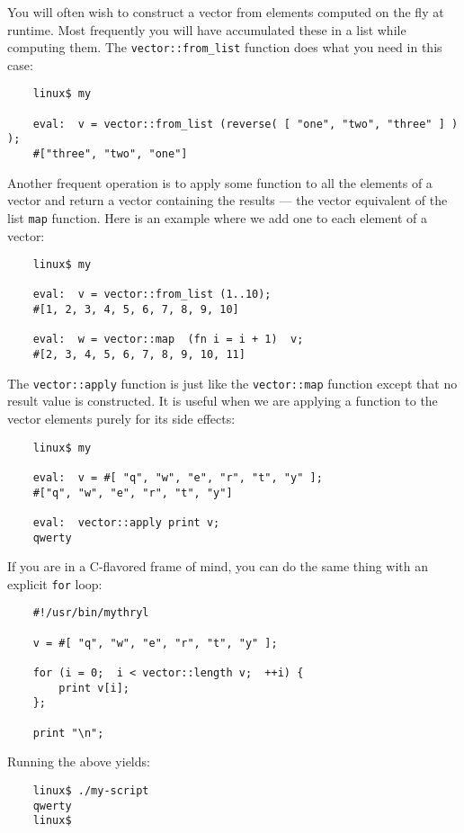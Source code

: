 You will often wish to construct a vector from elements computed on 
the fly at runtime.  Most frequently you will have accumulated these 
in a list while computing them.  The {\tt vector::from\_list} function 
does what you need in this case:

\begin{verbatim}
    linux$ my

    eval:  v = vector::from_list (reverse( [ "one", "two", "three" ] ) );
    #["three", "two", "one"]
\end{verbatim}

Another frequent operation is to apply some function to all the elements 
of a vector and return a vector containing the results --- the vector 
equivalent of the list {\tt map} function.  Here is an example where we 
add one to each element of a vector:

\begin{verbatim}
    linux$ my

    eval:  v = vector::from_list (1..10);
    #[1, 2, 3, 4, 5, 6, 7, 8, 9, 10]

    eval:  w = vector::map  (fn i = i + 1)  v;
    #[2, 3, 4, 5, 6, 7, 8, 9, 10, 11]
\end{verbatim}

The {\tt vector::apply} function is just like the {\tt vector::map} function 
except that no result value is constructed.  It is useful when we are applying 
a function to the vector elements purely for its side effects:

\begin{verbatim}
    linux$ my

    eval:  v = #[ "q", "w", "e", "r", "t", "y" ];
    #["q", "w", "e", "r", "t", "y"]

    eval:  vector::apply print v;
    qwerty
\end{verbatim}

If you are in a C-flavored frame of mind, you can do the same 
thing with an explicit {\tt for} loop:

\begin{verbatim}
    #!/usr/bin/mythryl

    v = #[ "q", "w", "e", "r", "t", "y" ];

    for (i = 0;  i < vector::length v;  ++i) {
        print v[i];
    };

    print "\n";
\end{verbatim}

Running the above yields:

\begin{verbatim}
    linux$ ./my-script
    qwerty
    linux$
\end{verbatim}


